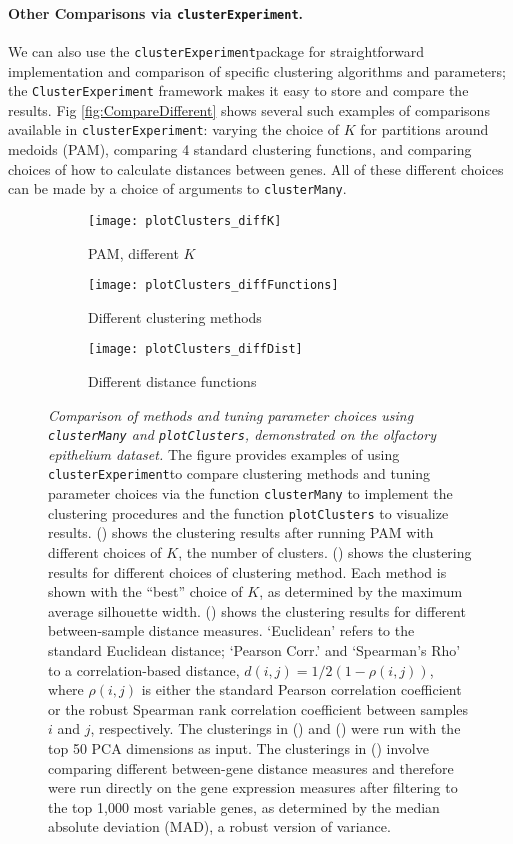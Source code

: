\documentclass[10pt,letterpaper]{article}
\newcommand{\f}[1]{\texttt{#1}}
\newcommand{\CE}{\f{clusterExperiment}}
\begin{document}
\paragraph{Other Comparisons via \CE.}

We can also use the \CE package for straightforward implementation and comparison of specific clustering algorithms and parameters; the \f{ClusterExperiment} framework makes it easy to store and compare the results. Fig \ref{fig:CompareDifferent} shows several such examples of comparisons available in \CE: varying the choice of $K$ for partitions around medoids (PAM), comparing 4 standard clustering functions, and comparing choices of how to calculate distances between genes. All of these different choices can be made by a choice of arguments to \f{clusterMany}.


\begin{figure}
\centering
	\begin{subfigure}[b]{0.45\textwidth}
	        \texttt{[image: plotClusters\_diffK]}
	        \caption{PAM, different $K$}
	        \label{subfig:diffK}
	   \end{subfigure}
	\begin{subfigure}[b]{0.45\textwidth}
		\texttt{[image: plotClusters\_diffFunctions]}
	        \caption{Different clustering methods}
	        \label{subfig:diffMethod}
	\end{subfigure}
	\begin{subfigure}[b]{0.45\textwidth}
		\texttt{[image: plotClusters\_diffDist]}
	        \caption{Different distance functions}
	        \label{subfig:diffDist}
	\end{subfigure}
\caption{{\em Comparison of methods and tuning parameter choices using \f{clusterMany} and \f{plotClusters}, demonstrated on the olfactory epithelium dataset.}
The figure provides examples of using \CE to compare clustering methods and tuning parameter choices via the function \f{clusterMany} to implement the clustering procedures and the function \f{plotClusters} to visualize results. (\protect{}) shows the clustering results after running PAM with different choices of $K$, the number of clusters. (\protect{}) shows the clustering results for different choices of clustering method. Each method is shown with the ``best'' choice of $K$, as determined by the maximum average silhouette width. (\protect{}) shows the clustering results for different between-sample distance measures. `Euclidean' refers to the standard Euclidean distance; `Pearson Corr.' and `Spearman's Rho' to a correlation-based distance, $d(i,j)=1/2(1-\rho(i,j))$, where $\rho(i,j)$ is either the standard Pearson correlation coefficient or the robust Spearman rank correlation coefficient between samples $i$ and $j$, respectively. The clusterings in (\protect{}) and  (\protect{}) were run with the top 50 PCA dimensions as input. The clusterings in (\protect{}) involve comparing different between-gene distance measures and therefore were run directly on the gene expression measures after filtering to the top 1,000 most variable genes, as determined by the median absolute deviation (MAD), a robust version of variance.}

\end{figure}
\end{document}
